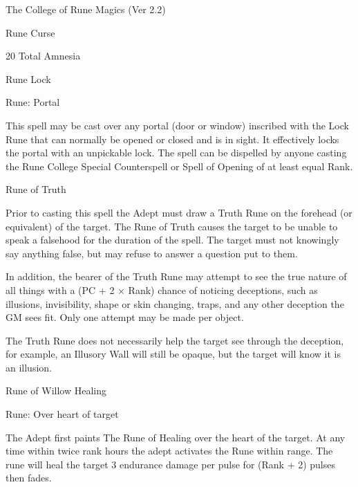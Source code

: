 \begin{Chapter}{The College of Rune Magics (Ver 2.2)}
\begin{spell}[S-6]{Rune Curse }
\begin{effects}
20 Total Amnesia 

\end{effects}
\end{spell}

\begin{spell}[S-7]{Rune Lock }

Rune: Portal 
\begin{effects}
This spell may be cast over any portal (door or window) inscribed with
the Lock Rune that can normally be opened or closed and is in
sight. It effectively locks the portal with an unpickable lock.  The
spell can be dispelled by anyone casting the Rune College Special
Counterspell or Spell of Opening of at least equal Rank.
\end{effects}
\end{spell}

\begin{spell}[S-8]{Rune of Truth }

\begin{effects}
Prior to casting this spell the Adept must draw a Truth Rune on the
forehead (or equivalent) of the target.  The Rune of Truth causes the
target to be unable to speak a falsehood for the duration of the
spell.  The target must not knowingly say anything false, but may
refuse to answer a question put to them.

In addition, the bearer of the Truth Rune may attempt to see the true
nature of all things with a (PC + 2 × Rank) chance of noticing
deceptions, such as illusions, invisibility, shape or skin changing,
traps, and any other deception the GM sees fit.  Only one attempt may
be made per object.

The Truth Rune does not necessarily help the target see through the
deception, for example, an Illusory Wall will still be opaque, but the
target will know it is an illusion.
\end{effects}
\end{spell}

\begin{spell}[S-9]{Rune of Willow Healing }

Rune: Over heart of target 
\begin{effects}
The Adept first paints The Rune of Healing over the heart of the
target. At any time within twice rank hours the adept activates the
Rune within range. The rune will heal the target 3 endurance damage
per pulse for (Rank + 2) pulses then fades.
\end{effects}
\end{spell}


\end{Chapter}
